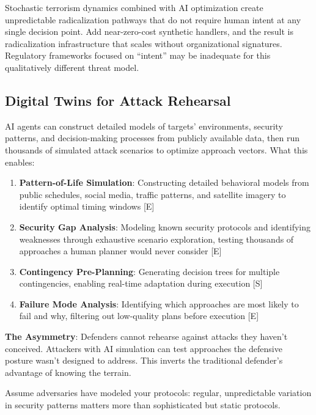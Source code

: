 \documentclass[11pt,letterpaper]{article}
\begin{document}
\begin{warnbox}
Stochastic terrorism dynamics combined with AI optimization create unpredictable radicalization pathways that do not require human intent at any single decision point. Add near-zero-cost synthetic handlers, and the result is radicalization infrastructure that scales without organizational signatures. Regulatory frameworks focused on ``intent'' may be inadequate for this qualitatively different threat model.
\end{warnbox}

\subsection{Digital Twins for Attack Rehearsal}

AI agents can construct detailed models of targets' environments, security patterns, and decision-making processes from publicly available data, then run thousands of simulated attack scenarios to optimize approach vectors. What this enables:

\begin{enumerate}
  \item \textbf{Pattern-of-Life Simulation}: Constructing detailed behavioral models from public schedules, social media, traffic patterns, and satellite imagery to identify optimal timing windows [E]
  \item \textbf{Security Gap Analysis}: Modeling known security protocols and identifying weaknesses through exhaustive scenario exploration, testing thousands of approaches a human planner would never consider [E]
  \item \textbf{Contingency Pre-Planning}: Generating decision trees for multiple contingencies, enabling real-time adaptation during execution [S]
  \item \textbf{Failure Mode Analysis}: Identifying which approaches are most likely to fail and why, filtering out low-quality plans before execution [E]
\end{enumerate}

\textbf{The Asymmetry}: Defenders cannot rehearse against attacks they haven't conceived. Attackers with AI simulation can test approaches the defensive posture wasn't designed to address. This inverts the traditional defender's advantage of knowing the terrain.

\begin{recbox}
Assume adversaries have modeled your protocols: regular, unpredictable variation in security patterns matters more than sophisticated but static protocols.
\end{recbox}
\end{document}
